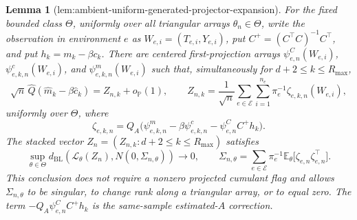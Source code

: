 \documentclass{article}
\newtheorem{lemma}{Lemma}
\begin{document}
\begin{lemma}[lem:ambient-uniform-generated-projector-expansion]\label{lem:ambient-uniform-generated-projector-expansion}
For the fixed bounded class \(\Theta\), uniformly over all triangular arrays \(\theta_n\in\Theta\), write the observation in environment \(e\) as \(W_{e,i}=(T_{e,i},Y_{e,i})\), put \(C^+=(C^\top C)^{-1}C^\top\), and put \(h_k=m_k-\beta c_k\).  There are centered first-projection arrays \(\psi^C_{e,n}(W_{e,i})\), \(\psi^c_{e,k,n}(W_{e,i})\), and \(\psi^m_{e,k,n}(W_{e,i})\) such that, simultaneously for \(d+2\leq k\leq R_{\max}\),
\[
 \sqrt n\,\widehat Q(\widehat m_k-\beta\widehat c_k)
 =Z_{n,k}+o_{\mathbb P}(1),
 \qquad
 Z_{n,k}=\frac1{\sqrt n}\sum_{e\in\mathcal E}\sum_{i=1}^{n_e}\pi_e^{-1}\zeta_{e,k,n}(W_{e,i}),
\]
uniformly over \(\Theta\), where
\[
 \zeta_{e,k,n}
 =Q_A\bigl(\psi^m_{e,k,n}-\beta\psi^c_{e,k,n}
       -\psi^C_{e,n}C^+h_k\bigr).
\]
The stacked vector \(Z_n=(Z_{n,k}:d+2\leq k\leq R_{\max})\) satisfies
\[
 \sup_{\theta\in\Theta}
 d_{\mathrm{BL}}\!\left(\mathcal L_\theta(Z_n),N(0,\Sigma_{n,\theta})\right)\longrightarrow0,
 \qquad
 \Sigma_{n,\theta}=\sum_{e\in\mathcal E}\pi_e^{-1}
 \mathbb E_\theta\bigl[\zeta_{e,n}\zeta_{e,n}^{\top}\bigr].
\]
This conclusion does not require a nonzero projected cumulant flag and allows \(\Sigma_{n,\theta}\) to be singular, to change rank along a triangular array, or to equal zero.  The term \(-Q_A\psi^C_{e,n}C^+h_k\) is the same-sample estimated-\(A\) correction.
\end{lemma}
\end{document}
